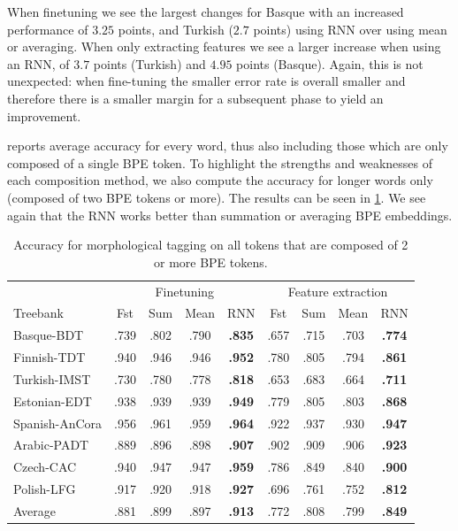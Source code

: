\documentclass[11pt]{article}
\begin{document}
        When finetuning we see the largest changes for Basque with an
        increased performance of $3.25$ points, and Turkish ($2.7$
        points) using RNN over using mean or averaging. When only
        extracting features we see a larger increase when using an
        RNN, of $3.7$ points (Turkish) and $4.95$ points
        (Basque). Again, this is not unexpected: when fine-tuning the
        smaller error rate is overall smaller and therefore there is a
        smaller margin for a subsequent phase to yield an improvement.

     reports average accuracy for every word,
    thus also including those which are only composed of a single BPE
    token. To highlight the strengths and weaknesses of each
    composition method, we also compute the accuracy for longer words only 
    (composed of two BPE tokens or more). The results can be seen in
    \cref{tab:results_large_tokens}.  We see again that the RNN works
    better than summation or averaging BPE embeddings.
    
	\begin{table}%
	\centering
	\begin{tabular}{l|cccc|cccc}
		 & \multicolumn{4}{c}{Finetuning} & \multicolumn{4}{c}{Feature extraction} \\
		Treebank & Fst & Sum & Mean & RNN & Fst & Sum & Mean & RNN  \\
		 \hline
        Basque-BDT      & .739 & .802 & .790 & \textbf{.835} & .657 & .715 & .703 & \textbf{.774} \\
		Finnish-TDT     & .940 & .946 & .946 & \textbf{.952} & .780 & .805 & .794 & \textbf{.861} \\ 
		Turkish-IMST    & .730 & .780 & .778 & \textbf{.818} & .653 & .683 & .664 & \textbf{.711} \\
		Estonian-EDT    & .938 & .939 & .939 & \textbf{.949} & .779 & .805 & .803 & \textbf{.868} \\
		Spanish-AnCora  & .956 & .961 & .959 & \textbf{.964} & .922 & .937 & .930 & \textbf{.947} \\
		Arabic-PADT     & .889 & .896 & .898 & \textbf{.907} & .902 & .909 & .906 & \textbf{.923}\\
		Czech-CAC       & .940 & .947 & .947 & \textbf{.959} & .786 & .849 & .840 & \textbf{.900} \\
		Polish-LFG      & .917 & .920 & .918 & \textbf{.927} & .696 & .761 & .752 & \textbf{.812} \\
        \hline
        Average         & .881 & .899 & .897 & \textbf{.913} & .772 & .808 & .799 & \textbf{.849} \\
	\end{tabular}
    \caption{\label{tab:results_large_tokens} Accuracy for
     morphological tagging on all tokens that are composed of 2 or
     more BPE tokens.}
\end{table}
\end{document}
